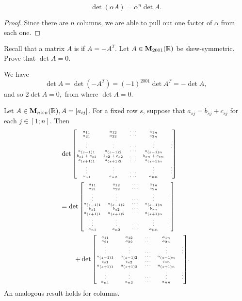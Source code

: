 \begin{cor}
$$\det (\alpha A) = \alpha ^n\det A.$$
\end{cor}
\begin{proof}
Since there are $n$ columns, we are able to pull out one factor of
$\alpha$ from each one.
\end{proof}
\begin{exa}
Recall that a matrix $A$ is  if $A =
 -A^T$. Let $A \in{\mathbf M}_{2001}(\mathbb{R})$ be
 skew-symmetric. Prove that $\det A = 0.$
 \end{exa}\begin{solu}We have $$\det A = \det (-A^T) = (-1)^{2001}\det A^T = -\det A,$$
 and so $2\det A = 0,$ from where $\det A = 0$.
 \end{solu}
 \begin{lemma}
Let $A \in {\mathbf M}_{n\times n}( \mathbb{R}), A = [a_{ij}]$. For a fixed row
$s$, suppose that $a_{sj} = b_{sj} + c_{sj}$ for each $j \in [1;n]$.
Then
$$\begin{array}{l}\tiny{\det \begin{bmatrix} a_{11}&  a_{12}&  \cdots &
a_{1n} \cr a_{21}&  a_{22}&  \cdots &  a_{2n} \cr \vdots & \vdots
& \cdots & \vdots & \vdots \cr a_{(s - 1)1}& a_{(s - 1)2}& \cdots
& a_{(s -1)n} \cr b_{s1} + c_{s1}& b_{s2} +c_{s2}& \cdots & b_{sn}
+c_{sn} \cr a_{(s+1)1}& a_{(s+1)2}& \cdots & a_{(s+1)n} \cr
\vdots & \vdots & \cdots & \vdots & \vdots \cr a_{n1}& a_{n2}&
\cdots & a_{nn} \cr
\end{bmatrix} } \vspace{2mm}\\   \tiny{=  \det   \begin{bmatrix} a_{11}&  a_{12}&  \cdots &  a_{1n} \cr
a_{21}&  a_{22}&  \cdots &  a_{2n} \cr \vdots & \vdots & \cdots &
\vdots & \vdots \cr a_{(s - 1)1}& a_{(s - 1)2}& \cdots & a_{(s
-1)n} \cr b_{s1}& b_{s2}& \cdots & b_{sn} \cr a_{(s+1)1}&
a_{(s+1)2}& \cdots & a_{(s+1)n} \cr  \vdots & \vdots & \cdots &
\vdots & \vdots \cr a_{n1}& a_{n2}& \cdots &  a_{nn} \cr
\end{bmatrix}}\vspace{2mm}\\ \qquad  \tiny{+ \det \begin{bmatrix} a_{11}&  a_{12}&  \cdots & a_{1n}
\cr a_{21}&  a_{22}&  \cdots &  a_{2n} \cr \vdots & \vdots &
\cdots & \vdots & \vdots \cr a_{(s - 1)1}& a_{(s - 1)2}& \cdots &
a_{(s -1)n} \cr c_{s1}& c_{s2}& \cdots & c_{sn} \cr a_{(s + 1)1}&
a_{(s+1)2}& \cdots & a_{(s+1)n} \cr  \vdots & \vdots & \cdots &
\vdots & \vdots \cr a_{n1}& a_{n2}& \cdots &  a_{nn} \cr
\end{bmatrix}}.
 \end{array} $$
 \label{lem:row_linearity_of_determinants}
An analogous result holds for columns.



 \end{lemma}
